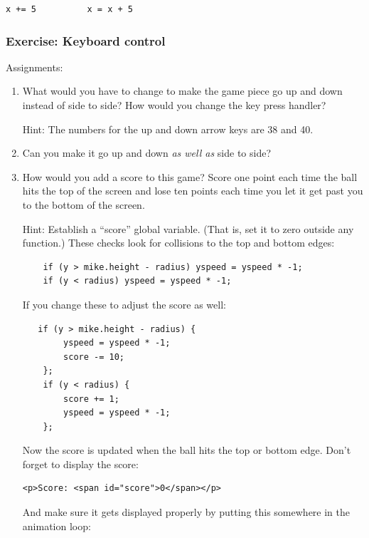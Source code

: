 \documentclass[11pt]{article}
\begin{document}
\begin{verbatim}
x += 5          x = x + 5
\end{verbatim}


\subsubsection{Exercise: Keyboard control}

Assignments:

\begin{enumerate}

\item What would you have to change to make the game piece go up and
  down instead of side to side?  How would you change the key press
  handler?

Hint: The numbers for the up and down arrow keys are 38 and 40.

\item Can you make it go up and down \emph{as well as} side to side?

\item How would you add a score to this game?  Score one point each
  time the ball hits the top of the screen and lose ten points each
  time you let it get past you to the bottom of the screen.

Hint:  Establish a ``score'' global variable.  (That is, set it to
zero outside any function.)  These checks look for collisions to the
top and bottom edges:

\begin{verbatim}
    if (y > mike.height - radius) yspeed = yspeed * -1;
    if (y < radius) yspeed = yspeed * -1;
\end{verbatim}


If you change these to adjust the score as well:

\begin{verbatim}
   if (y > mike.height - radius) {
        yspeed = yspeed * -1;
        score -= 10;
    };
    if (y < radius) {
        score += 1;
        yspeed = yspeed * -1;
    };
\end{verbatim}

Now the score is updated when the ball hits the top or bottom edge.
Don't forget to display the score:

\begin{verbatim}
<p>Score: <span id="score">0</span></p>
\end{verbatim}

And make sure it gets displayed properly by putting this somewhere in
the animation loop:


\end{enumerate}
\end{document}
